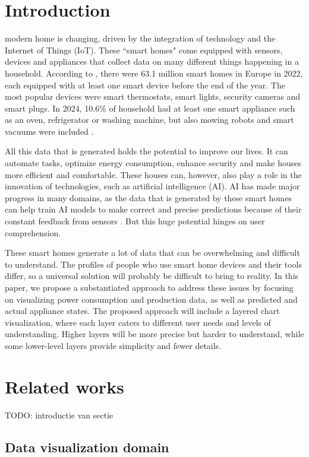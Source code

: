 \documentclass[journal]{IEEEtran}
\begin{document}
\section{Introduction}
 modern home is changing, driven by the integration of technology and the Internet of Things (IoT). These ``smart homes" come equipped with sensors, devices and appliances that collect data on many different things happening in a household. According to \cite{The2022}, there were 63.1 million smart homes in Europe in 2022, each equipped with at least one smart device before the end of the year. The most popular devices were smart thermostats, smart lights, security cameras and smart plugs. In 2024, 10.6\% of household had at least one smart appliance such as an oven, refrigerator or washing machine, but also mowing robots and smart vacuums were included \cite{2024SmartForecast}. 

All this data that is generated holds the potential to improve our lives. It can automate tasks, optimize energy consumption, enhance security and make houses more efficient and comfortable. These houses can, however, also play a role in the innovation of technologies, such as artificial intelligence (AI). AI has made major progress in many domains, as the data that is generated by these smart homes can help train AI models to make correct and precise predictions because of their constant feedback from sensors \cite{NarsunStudios2023UsingFuture}. But this huge potential hinges on user comprehension. 

These smart homes generate a lot of data that can be overwhelming and difficult to understand. The profiles of people who use smart home devices and their tools differ, so a universal solution will probably be difficult to bring to reality. In this paper, we propose a substantiated approach to address these issues by focusing on visualizing power consumption and production data, as well as predicted and actual appliance states. The proposed approach will include a layered chart visualization, where each layer caters to different user needs and levels of understanding. Higher layers will be more precise but harder to understand, while some lower-level layers provide simplicity and fewer details.

\section{Related works}
TODO: introductie van sectie

\subsection{Data visualization domain}
\end{document}
